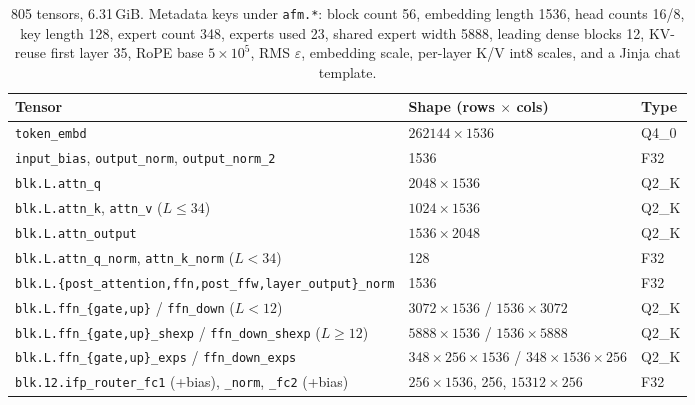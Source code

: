 \documentclass[11pt,reqno]{amsart}
\newcommand{\code}[1]{\texttt{#1}}
\theoremstyle{definition}
\begin{document}
\begin{table}[H]
\centering\footnotesize
\begin{tabular}{@{}lll@{}}
\toprule
Tensor & Shape (rows $\times$ cols) & Type \\
\midrule
\code{token\_embd} & $262144\times1536$ & Q4\_0 \\
\code{input\_bias}, \code{output\_norm}, \code{output\_norm\_2} & 1536 & F32 \\
\code{blk.L.attn\_q} & $2048\times1536$ & Q2\_K \\
\code{blk.L.attn\_k}, \code{attn\_v} ($L\le34$) & $1024\times1536$ & Q2\_K \\
\code{blk.L.attn\_output} & $1536\times2048$ & Q2\_K \\
\code{blk.L.attn\_q\_norm}, \code{attn\_k\_norm} ($L<34$) & 128 & F32 \\
\code{blk.L.\{post\_attention,ffn,post\_ffw,layer\_output\}\_norm} & 1536 & F32 \\
\code{blk.L.ffn\_\{gate,up\}} / \code{ffn\_down} ($L<12$) & $3072\times1536$ / $1536\times3072$ & Q2\_K \\
\code{blk.L.ffn\_\{gate,up\}\_shexp} / \code{ffn\_down\_shexp} ($L\ge12$) & $5888\times1536$ / $1536\times5888$ & Q2\_K \\
\code{blk.L.ffn\_\{gate,up\}\_exps} / \code{ffn\_down\_exps} & $348\times256\times1536$ / $348\times1536\times256$ & Q2\_K \\
\code{blk.12.ifp\_router\_fc1} (+bias), \code{\_norm}, \code{\_fc2} (+bias) & $256\times1536$, 256, $15312\times256$ & F32 \\
\bottomrule
\end{tabular}
\caption{805 tensors, 6.31\,GiB. Metadata keys under \code{afm.*}: block count 56, embedding length 1536, head counts 16/8, key length 128, expert count 348, experts used 23, shared expert width 5888, leading dense blocks 12, KV-reuse first layer 35, RoPE base $5\times10^5$, RMS $\varepsilon$, embedding scale, per-layer K/V int8 scales, and a Jinja chat template.}
\end{table}
\end{document}

